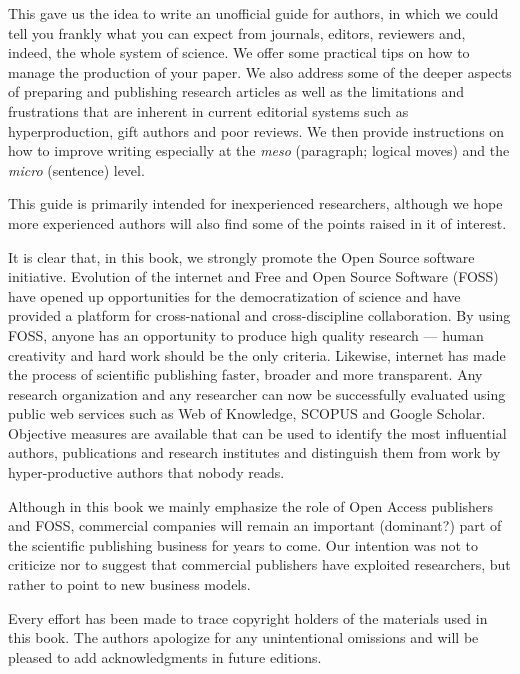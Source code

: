 \documentclass[graybox,envcountchap,sectrefs,UStrade]{svmono}
\begin{document}
This gave us the idea to write an unofficial guide for authors, in which we could tell you frankly what you can expect from journals, editors, reviewers and, indeed, the whole system of science. We offer some practical tips on how to manage the production of your paper. We also address some of the deeper aspects of preparing and publishing research articles as well as the limitations and frustrations that are inherent in current editorial systems such as hyperproduction, gift authors and poor reviews. We then provide instructions on how to improve writing especially at the \emph{meso} (paragraph; logical moves) and the \emph{micro} (sentence) level.\par

This guide is primarily intended for inexperienced researchers, although we hope more experienced authors will also find some of the points raised in it of interest.\par

It is clear that, in this book, we strongly promote the Open Source software initiative. Evolution of the internet and Free and Open Source Software (FOSS) have opened up opportunities for the democratization of science and have provided a platform for cross-national and cross-discipline collaboration. By using FOSS, anyone has an opportunity to produce high quality research --- human creativity and hard work should be the only criteria. Likewise, internet has made the process of scientific publishing faster, broader and more transparent. Any research organization and any researcher can now be successfully evaluated using public web services such as Web of Knowledge, SCOPUS and Google Scholar. Objective measures are available that can be used to identify the most influential authors, publications and research institutes and distinguish them from work by hyper-productive authors that nobody reads. \par

Although in this book we mainly emphasize the role of Open Access publishers and FOSS, commercial companies will remain an important (dominant?) part of the scientific publishing business for years to come. Our intention was not to criticize nor to suggest that commercial publishers have exploited researchers, but rather to point to new business models. \par

\bigskip

Every effort has been made to trace copyright holders of the materials used in this book. The authors apologize for any unintentional omissions and will be pleased to add acknowledgments in future editions.\par
\end{document}
